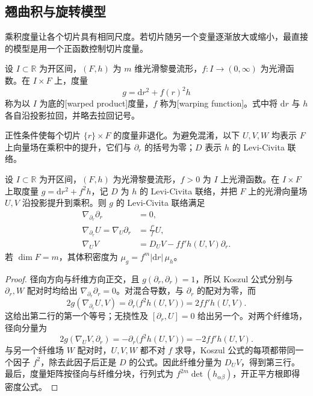 \subsection{翘曲积与旋转模型}
\label{g3:subsec:0104:03}
乘积度量让各个切片具有相同尺度。若切片随另一个变量逐渐放大或缩小，最直接的模型是用一个正函数控制切片度量。

\begin{definition}\label{g3:def:warped-product-interval}
	设 \(I\subset\mathbb R\) 为开区间，\((F,h)\) 为 \(m\) 维光滑黎曼流形，\(f:I\rightarrow(0,\infty)\) 为光滑函数。在 \(I\times F\) 上，度量
	\begin{equation}\label{g3:eq:warped-product-interval}
		g=\mathrm dr^2+f(r)^2h
	\end{equation}
	称为以 \(I\) 为底的[warped product]度量，\(f\) 称为[warping function]。式中将 \(\mathrm dr\) 与 \(h\) 各自沿投影拉回，并略去拉回记号。
\end{definition}

正性条件使每个切片 \(\{r\}\times F\) 的度量非退化。为避免混淆，以下 \(U,V,W\) 均表示 \(F\) 上向量场在乘积中的提升，它们与 \(\partial_r\) 的括号为零；\(D\) 表示 \(h\) 的 Levi-Civita 联络。

\begin{proposition}\label{g3:prop:warped-product-connection}
	设 \(I\subset\mathbb R\) 为开区间，\((F,h)\) 为光滑黎曼流形，\(f>0\) 为 \(I\) 上光滑函数。在 \(I\times F\) 上取度量 \(g=\mathrm dr^2+f^2h\)，记 \(D\) 为 \(h\) 的 Levi-Civita 联络，并把 \(F\) 上的光滑向量场 \(U,V\) 沿投影提升到乘积。则 \(g\) 的 Levi-Civita 联络满足
	\begin{equation}\label{g3:eq:warped-product-connection}
		\begin{aligned}
			\nabla_{\partial_r}\partial_r&=0,\\
			\nabla_{\partial_r}U=\nabla_U\partial_r&=\frac{f'}fU,\\
			\nabla_UV&=D_UV-ff' h(U,V)\partial_r.
		\end{aligned}
	\end{equation}
	若 \(\dim F=m\)，其体积密度为 \(\mu_g=f^m|\mathrm dr|\,\mu_h\)。
\end{proposition}
\begin{proof}
	径向方向与纤维方向正交，且 \(g(\partial_r,\partial_r)=1\)，所以 Koszul 公式分别与 \(\partial_r,W\) 配对时均给出 \(\nabla_{\partial_r}\partial_r=0\)。对混合导数，与 \(\partial_r\) 的配对为零，而
	\[
		2g(\nabla_{\partial_r}U,V)
		=\partial_r\bigl(f^2h(U,V)\bigr)=2ff'h(U,V).
	\]
	这给出第二行的第一个等号；无挠性及 \([\partial_r,U]=0\) 给出另一个。对两个纤维场，径向分量为
	\[
		2g(\nabla_UV,\partial_r)
		=-\partial_r\bigl(f^2h(U,V)\bigr)=-2ff'h(U,V).
	\]
	与另一个纤维场 \(W\) 配对时，\(U,V,W\) 都不对 \(f\) 求导，Koszul 公式的每项都带同一个因子 \(f^2\)，除去此因子后正是 \(D\) 的公式。因此纤维分量为 \(D_UV\)，得到第三行。最后，度量矩阵按径向与纤维分块，行列式为 \(f^{2m}\det(h_{\alpha\beta})\)，开正平方根即得密度公式。
\end{proof}

